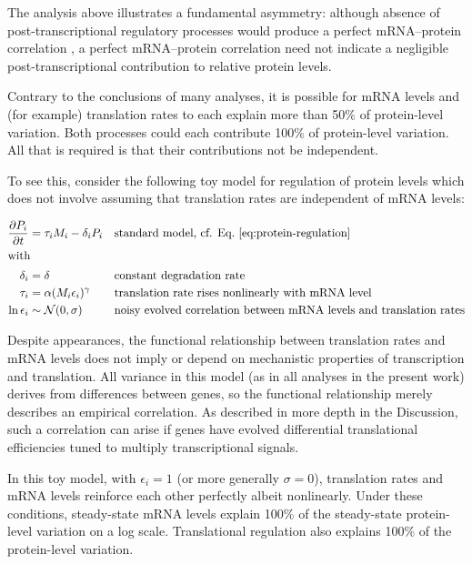 \documentclass[10pt]{article}
\begin{document}
The analysis above illustrates a fundamental asymmetry: although
absence of post-transcriptional regulatory processes would produce a
perfect mRNA--protein correlation \cite{desousa09}, a perfect mRNA--protein 
correlation need not indicate a negligible post-transcriptional
contribution to relative protein levels. 

Contrary to the conclusions of many analyses, it is possible for mRNA  levels
and (for example) translation rates to each explain more  than 50\% of
protein-level variation. Both processes could each contribute 100\% of
protein-level variation. All that is required  is that their contributions not
be independent.

To see this, consider the following toy model for regulation of protein levels which does not involve assuming that translation rates are independent of mRNA levels:

\begin{align*}
\frac{\partial P_i}{\partial t} &= \tau_i M_i - \delta_i P_i &&\text{standard model, cf. Eq.~\ref{eq:protein-regulation}}\\
\intertext{with}
\delta_i &= \delta &&\text{constant degradation rate}\\
\tau_i &= \alpha (M_i \epsilon_i)^\gamma &&\text{translation rate rises nonlinearly with mRNA level}\\
\ln \epsilon_i &\sim \mathcal{N}(0,\sigma) &&\text{noisy evolved correlation between mRNA levels and translation rates}\\
\end{align*}

Despite appearances, the functional relationship between translation rates and mRNA levels does not imply or depend on mechanistic properties of transcription and translation. All variance in this model (as in all analyses in the present work) derives from differences between genes, so the functional relationship merely describes an empirical correlation. As described in more depth in the Discussion, such a correlation can arise if genes have evolved differential translational efficiencies tuned to multiply transcriptional signals.

In this toy model, with $\epsilon_i = 1$ (or more generally $\sigma=0$), translation rates and mRNA levels reinforce each other perfectly albeit nonlinearly. Under these conditions, steady-state mRNA levels explain 100\% of the steady-state protein-level variation on a log scale. Translational regulation also explains 100\% of the protein-level variation.
\end{document}
